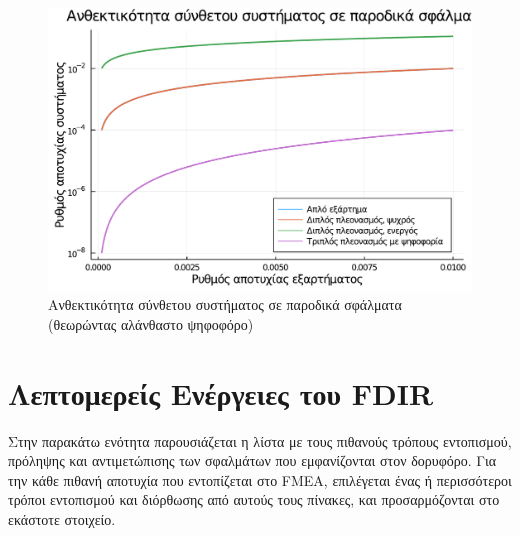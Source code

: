 \documentclass[a4paper,nobib]{tufte-book}
\begin{document}
\begin{figure}
	\centering
	\includegraphics{analysis/reliability_repair}
	\caption{Ανθεκτικότητα σύνθετου συστήματος σε παροδικά σφάλματα (θεωρώντας αλάνθαστο ψηφοφόρο)}
	\label{fig:reliability_repair}
\end{figure}


\FloatBarrier
\section{Λεπτομερείς Ενέργειες του FDIR}

Στην παρακάτω ενότητα παρουσιάζεται η λίστα με τους πιθανούς τρόπους εντοπισμού, πρόληψης και αντιμετώπισης των σφαλμάτων που εμφανίζονται στον δορυφόρο. Για την κάθε πιθανή αποτυχία που εντοπίζεται στο \acs{FMEA}, \autocite{retselis_acubesat_fmea_2020} επιλέγεται ένας ή περισσότεροι τρόποι εντοπισμού και διόρθωσης από αυτούς τους πίνακες, και προσαρμόζονται στο εκάστοτε στοιχείο.

\clearpage
\end{document}

